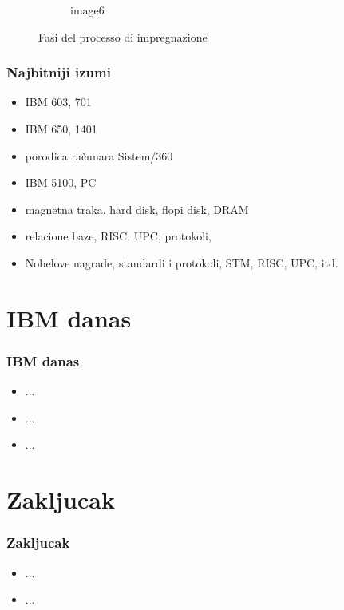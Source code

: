 \documentclass{beamer}
\begin{document}
\begin{frame}[fragile]
\begin{figure}[htb]
\begin{subfigure}{0.25\textwidth}
  \caption{image6}
  \label{fig:6}
\end{subfigure}
\caption{Fasi del processo di impregnazione}
\label{fig:images}
\end{figure}
\end{frame}

\begin{frame}[fragile]\frametitle{Najbitniji izumi}
	\begin{itemize}	
		\item IBM 603, 701
		\item IBM 650, 1401	
		\item porodica računara Sistem/360
		\item IBM 5100, PC
		\item magnetna traka, hard disk, flopi disk, DRAM
		\item relacione baze, RISC, UPC, protokoli,
		\item Nobelove nagrade, standardi i protokoli, STM, RISC, UPC, itd.
		\end{itemize}
\end{frame}
	

\section{IBM danas}

\begin{frame}[fragile]\frametitle{IBM danas}
	\begin{itemize}	
		\item ...
		\item ...
		\item ...
	\end{itemize}
\end{frame}

\section{Zakljucak}

\begin{frame}[fragile]\frametitle{Zakljucak}
	\begin{itemize}	
		\item ...
		\item ...
	\end{itemize}
\end{frame}
\end{document}
